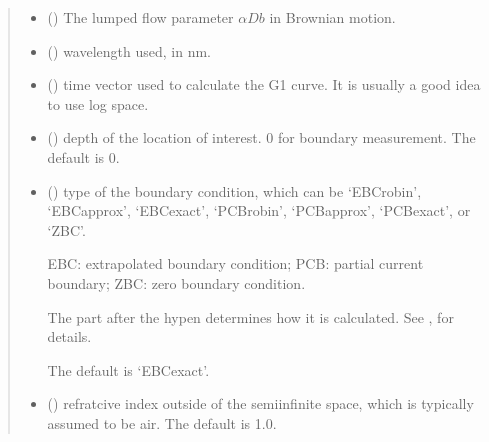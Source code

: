 \documentclass[letterpaper,10pt,english]{sphinxmanual}
\begin{document}
\begin{fulllineitems}
\begin{quote}
\begin{description}
\begin{itemize}
\item {} 
\sphinxAtStartPar
{} () \textendash{} The lumped flow parameter \(\alpha Db\) in Brownian motion.

\item {} 
\sphinxAtStartPar
{} () \textendash{} wavelength used, in nm.

\item {} 
\sphinxAtStartPar
{} () \textendash{} time vector used to calculate the G1 curve. It is usually a good idea to use log space.

\item {} 
\sphinxAtStartPar
{} (\sphinxstyleliteralemphasis{\sphinxupquote{, }}) \textendash{} depth of the location of interest. 0 for boundary measurement. The default is 0.

\item {} 
\sphinxAtStartPar
{} (\sphinxstyleliteralemphasis{\sphinxupquote{, }}) \textendash{} 
\sphinxAtStartPar
type of the boundary condition, which can be ‘EBC\sphinxhyphen{}robin’, ‘EBC\sphinxhyphen{}approx’, ‘EBC\sphinxhyphen{}exact’, ‘PCB\sphinxhyphen{}robin’, ‘PCB\sphinxhyphen{}approx’, ‘PCB\sphinxhyphen{}exact’, or ‘ZBC’.

\sphinxAtStartPar
EBC: extrapolated boundary condition; PCB: partial current boundary; ZBC: zero boundary condition.

\sphinxAtStartPar
The part after the hypen determines how it is calculated.
See {\hyperref[\detokenize{_autosummary/nirfasterff.utils.boundary_attenuation:nirfasterff.utils.boundary_attenuation}]{}},  for details.

\sphinxAtStartPar
The default is ‘EBC\sphinxhyphen{}exact’.


\item {} 
\sphinxAtStartPar
{} (\sphinxstyleliteralemphasis{\sphinxupquote{, }}) \textendash{} refratcive index outside of the semi\sphinxhyphen{}infinite space, which is typically assumed to be air. The default is 1.0.


\end{itemize}
\end{description}
\end{quote}
\end{fulllineitems}
\end{document}
